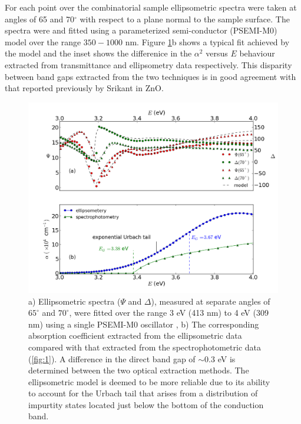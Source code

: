 \documentclass[final,5p,times]{elsarticle}
\begin{document}
For each point over the combinatorial sample ellipsometric spectra were taken at angles of 65 and 70$^{\circ}$ with respect to a plane normal to the sample surface. The spectra were and fitted using a parameterized semi-conductor (PSEMI-M0) model \cite{Paulson1998} over the range $350 - 1000$ nm. Figure \ref{fig:2}b shows a typical fit achieved by the model and the inset shows the differenice in the $\alpha^2$ versus $E$ behaviour extracted from transmittance and ellipsometry data respectively. This disparity between band gaps extracted from the two techniques is in good agreement with that reported previously by Srikant \cite{Srikant1998} in ZnO.
\begin{figure}[bt]
\centering
\includegraphics[width = 1\columnwidth]{figure_0.png}
\caption{\label{fig:2} a) Ellipsometric spectra ($\Psi$ and $\Delta$), measured at separate angles of $65^{\circ}$ and $70^{\circ}$, were fitted over the range 3 eV (413 nm) to 4 eV (309 nm) using a single PSEMI-M0 oscillator \cite{Paulson1998, Johs1999}, b) The corresponding absorption coefficient extracted from the ellipsometric data compared with that extracted from the spectrophotometric data (\ref{fig:1}). A difference in the direct band gap of $\sim0.3$ eV is determined between the two optical extraction methods. The ellipsometric model is deemed to be more reliable due to its ability to account for the Urbach tail that arises from a distribution of impurtity states located just below the bottom of the conduction band.}
\end{figure}
\end{document}
